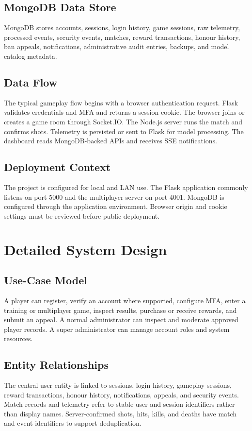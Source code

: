 \documentclass[12pt,a4paper,oneside]{report}
\begin{document}
\section{MongoDB Data Store}
MongoDB stores accounts, sessions, login history, game sessions, raw telemetry, processed events, security events, matches, reward transactions, honour history, ban appeals, notifications, administrative audit entries, backups, and model catalog metadata.

\section{Data Flow}
The typical gameplay flow begins with a browser authentication request. Flask validates credentials and MFA and returns a session cookie. The browser joins or creates a game room through Socket.IO. The Node.js server runs the match and confirms shots. Telemetry is persisted or sent to Flask for model processing. The dashboard reads MongoDB-backed APIs and receives SSE notifications.

\section{Deployment Context}
The project is configured for local and LAN use. The Flask application commonly listens on port 5000 and the multiplayer server on port 4001. MongoDB is configured through the application environment. Browser origin and cookie settings must be reviewed before public deployment.

\chapter{Detailed System Design}
\section{Use-Case Model}
A player can register, verify an account where supported, configure MFA, enter a training or multiplayer game, inspect results, purchase or receive rewards, and submit an appeal. A normal administrator can inspect and moderate approved player records. A super administrator can manage account roles and system resources.

\section{Entity Relationships}
The central user entity is linked to sessions, login history, gameplay sessions, reward transactions, honour history, notifications, appeals, and security events. Match records and telemetry refer to stable user and session identifiers rather than display names. Server-confirmed shots, hits, kills, and deaths have match and event identifiers to support deduplication.
\end{document}
